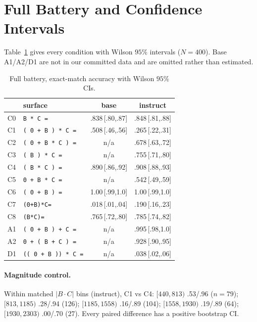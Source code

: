 \section{Full Battery and Confidence Intervals}
\label{app:battery}

Table~\ref{tab:fullbattery} gives every condition with Wilson $95\%$ intervals
($N = 400$). Base A1/A2/D1 are not in our committed data and are omitted rather than
estimated.

\begin{table}[h]
\centering
\footnotesize
\setlength{\tabcolsep}{3pt}
\begin{tabular}{@{}llcc@{}}
\toprule
 & surface & base & instruct \\
\midrule
C0 & \texttt{B * C =} & .838\,{\scriptsize[.80,.87]} & .848\,{\scriptsize[.81,.88]} \\
C1 & \texttt{( 0 + B ) * C =} & .508\,{\scriptsize[.46,.56]} & .265\,{\scriptsize[.22,.31]} \\
C2 & \texttt{( 0 + B * C ) =} & n/a & .678\,{\scriptsize[.63,.72]} \\
C3 & \texttt{( B ) * C =} & n/a & .755\,{\scriptsize[.71,.80]} \\
C4 & \texttt{( B * C ) =} & .890\,{\scriptsize[.86,.92]} & .908\,{\scriptsize[.88,.93]} \\
C5 & \texttt{0 + B * C =} & n/a & .542\,{\scriptsize[.49,.59]} \\
C6 & \texttt{( 0 + B ) =} & 1.00\,{\scriptsize[.99,1.0]} & 1.00\,{\scriptsize[.99,1.0]} \\
C7 & \texttt{(0+B)*C=} & .018\,{\scriptsize[.01,.04]} & .190\,{\scriptsize[.16,.23]} \\
C8 & \texttt{(B*C)=} & .765\,{\scriptsize[.72,.80]} & .785\,{\scriptsize[.74,.82]} \\
A1 & \texttt{( 0 + B ) + C =} & n/a & .995\,{\scriptsize[.98,1.0]} \\
A2 & \texttt{0 + ( B + C ) =} & n/a & .928\,{\scriptsize[.90,.95]} \\
D1 & \texttt{(( 0 + B )) * C =} & n/a & .038\,{\scriptsize[.02,.06]} \\
\bottomrule
\end{tabular}
\caption{Full battery, exact-match accuracy with Wilson $95\%$ CIs.}
\label{tab:fullbattery}
\end{table}

\paragraph{Magnitude control.} Within matched $|B\!\cdot\!C|$ bins (instruct), C1 vs C4:
$[440,813)$ .53/.96 ($n{=}79$); $[813,1185)$ .28/.94 (126); $[1185,1558)$ .16/.89 (104);
$[1558,1930)$ .19/.89 (64); $[1930,2303)$ .00/.70 (27). Every paired difference has a
positive bootstrap CI.


